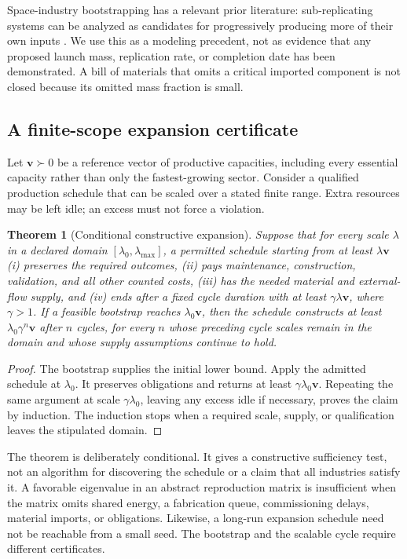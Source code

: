 \documentclass[11pt,letterpaper]{article}
\newcommand{\1}{\mathbf 1}
\newtheorem{theorem}{Theorem}[section]
\theoremstyle{remark}\newtheorem{remark}{Remark}[section]
\begin{document}
Space-industry bootstrapping has a relevant prior literature: sub-replicating systems can be analyzed as candidates for progressively producing more of their own inputs \citep{metzger}. We use this as a modeling precedent, not as evidence that any proposed launch mass, replication rate, or completion date has been demonstrated. A bill of materials that omits a critical imported component is not closed because its omitted mass fraction is small.

\subsection{A finite-scope expansion certificate}
Let $\mathbf v\succ0$ be a reference vector of productive capacities, including every essential capacity rather than only the fastest-growing sector. Consider a qualified production schedule that can be scaled over a stated finite range. Extra resources may be left idle; an excess must not force a violation.

\begin{theorem}[Conditional constructive expansion]\label{thm:expansion}
Suppose that for every scale $\lambda$ in a declared domain $[\lambda_0,\lambda_{\max}]$, a permitted schedule starting from at least $\lambda\mathbf v$ (i) preserves the required outcomes, (ii) pays maintenance, construction, validation, and all other counted costs, (iii) has the needed material and external-flow supply, and (iv) ends after a fixed cycle duration with at least $\gamma\lambda\mathbf v$, where $\gamma>1$. If a feasible bootstrap reaches $\lambda_0\mathbf v$, then the schedule constructs at least $\lambda_0\gamma^n\mathbf v$ after $n$ cycles, for every $n$ whose preceding cycle scales remain in the domain and whose supply assumptions continue to hold.
\end{theorem}
\begin{proof}
The bootstrap supplies the initial lower bound. Apply the admitted schedule at $\lambda_0$. It preserves obligations and returns at least $\gamma\lambda_0\mathbf v$. Repeating the same argument at scale $\gamma\lambda_0$, leaving any excess idle if necessary, proves the claim by induction. The induction stops when a required scale, supply, or qualification leaves the stipulated domain.
\end{proof}

The theorem is deliberately conditional. It gives a constructive sufficiency test, not an algorithm for discovering the schedule or a claim that all industries satisfy it. A favorable eigenvalue in an abstract reproduction matrix is insufficient when the matrix omits shared energy, a fabrication queue, commissioning delays, material imports, or obligations. Likewise, a long-run expansion schedule need not be reachable from a small seed. The bootstrap and the scalable cycle require different certificates.
\end{document}
